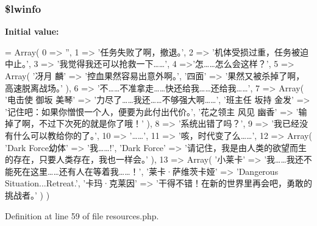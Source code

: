 \hypertarget{resources_8php_a8bc9ffb8d571d6f8b62846c5ba0b9749}{
\subsubsection[{\$lwinfo}]{\setlength{\rightskip}{0pt plus 5cm}\$lwinfo}}\label{resources_8php_a8bc9ffb8d571d6f8b62846c5ba0b9749}
{\bfseries Initial value\+:}
\begin{DoxyCode}
= Array(
    0 => \textcolor{stringliteral}{''},
    1 => \textcolor{stringliteral}{'任务失败了啊，撤退。'},
    2 => \textcolor{stringliteral}{'机体受损过重，任务被迫中止。'},
    3 => \textcolor{stringliteral}{'我觉得我还可以抢救一下……'},
    4 =>\textcolor{stringliteral}{'怎……怎么会这样？'},
    5 => Array(
        \textcolor{stringliteral}{'冴月 麟'} => \textcolor{stringliteral}{'控血果然容易出意外啊。'},
        \textcolor{stringliteral}{'四面'} => \textcolor{stringliteral}{'果然又被杀掉了啊，高速脱离战场。'}
    ),
    6 => \textcolor{stringliteral}{'不……不准拿走……快还给我……还给我……'},
    7 => Array(
        \textcolor{stringliteral}{'电击使 御坂 美琴'} => \textcolor{stringliteral}{'力尽了……我还……不够强大啊……'},
        \textcolor{stringliteral}{'班主任 坂持 金发'} => \textcolor{stringliteral}{'记住吧：如果你憎恨一个人，便要为此付出代价。'},
        \textcolor{stringliteral}{'花之领主 风见 幽香'} => \textcolor{stringliteral}{'输掉了啊，不过下次死的就是你了哦！'}
    ),
    8 => \textcolor{stringliteral}{'系统出错了吗？'},
    9 => \textcolor{stringliteral}{'我已经没有什么可以教给你的了。'},
    10 => \textcolor{stringliteral}{'……'},
    11 => \textcolor{stringliteral}{'咳，时代变了么……'},
    12 => Array(
        \textcolor{stringliteral}{'Dark Force幼体'} => \textcolor{stringliteral}{'我……!'},
        \textcolor{stringliteral}{'Dark Force'} => \textcolor{stringliteral}{'请记住，我是由人类的欲望而生的存在，只要人类存在，我也一样会。'}
    ),
    13 => Array(
        \textcolor{stringliteral}{'小莱卡'} => \textcolor{stringliteral}{'我……我还不能死在这里……还有人在等着我……！'},
        \textcolor{stringliteral}{'莱卡·萨维茨卡娅'} => \textcolor{stringliteral}{'Dangerous Situation...Retreat.'},
        \textcolor{stringliteral}{'卡玛·克莱因'} => \textcolor{stringliteral}{'干得不错！在新的世界里再会吧，勇敢的挑战者。'}
    )
)
\end{DoxyCode}


Definition at line 59 of file resources.\+php.

